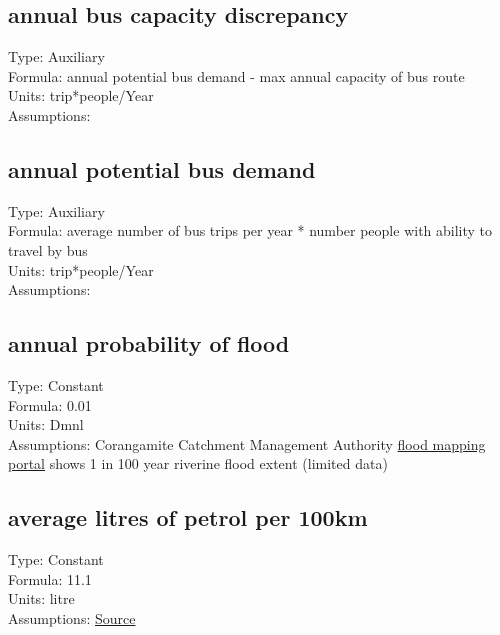 \documentclass[
  11pt,
]{book}
\begin{document}
\hypertarget{annual-bus-capacity-discrepancy}{%
\subsection{annual bus capacity discrepancy}\label{annual-bus-capacity-discrepancy}}

Type: Auxiliary\\
Formula: annual potential bus demand - max annual capacity of bus route\\
Units: trip*people/Year\\
Assumptions:

\hypertarget{annual-potential-bus-demand}{%
\subsection{annual potential bus demand}\label{annual-potential-bus-demand}}

Type: Auxiliary\\
Formula: average number of bus trips per year * number people with ability to travel by bus\\
Units: trip*people/Year\\
Assumptions:

\hypertarget{annual-probability-of-flood-1}{%
\subsection{annual probability of flood}\label{annual-probability-of-flood-1}}

Type: Constant\\
Formula: 0.01\\
Units: Dmnl\\
Assumptions: Corangamite Catchment Management Authority \href{https://www.ccmaknowledgebase.vic.gov.au/flood/cb_pages/flood_mapping.php}{flood mapping portal} shows 1 in 100 year riverine flood extent (limited data)

\hypertarget{average-litres-of-petrol-per-100km}{%
\subsection{average litres of petrol per 100km}\label{average-litres-of-petrol-per-100km}}

Type: Constant\\
Formula: 11.1\\
Units: litre\\
Assumptions: \href{https://www.abs.gov.au/statistics/industry/tourism-and-transport/survey-motor-vehicle-use-australia/latest-release}{Source}
\end{document}
